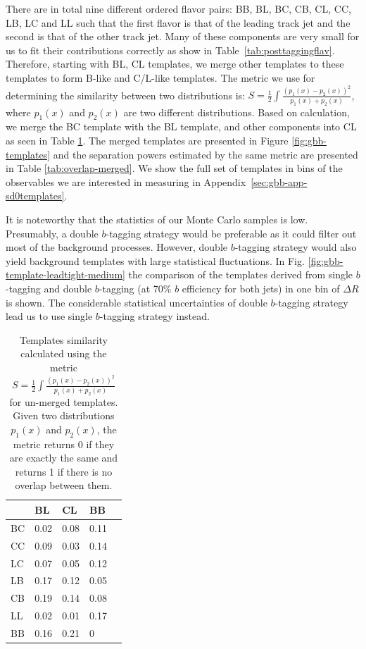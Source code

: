 There are in total nine different ordered flavor pairs: BB, BL, BC, CB, CL, CC, 
LB, LC and LL such that the first flavor is that of the leading track jet and 
the second is that of the other track jet. Many of these components are very small 
for us to fit their contributions correctly as show in Table~\ref{tab:posttaggingflav}. 
Therefore, starting with BL, CL templates, we merge other templates to these templates
to form B-like and C/L-like templates. The metric we use for determining the similarity 
between two distributions is: $S=\frac{1}{2}\int \frac{(p_1(x)-p_2(x))^2}{p_1(x)+p_2(x)}$, 
where $p_1(x)$ and $p_2(x)$ are two different distributions. 
Based on calculation, we merge the BC template with the BL 
template, and other components into CL as seen in 
Table \ref{tab:overlap-unmerged}. The merged templates are 
presented in Figure \ref{fig:gbb-templates} and the separation powers estimated by the same metric are 
presented in Table \ref{tab:overlap-merged}. 
We show the full set of templates in bins of the observables we are interested in 
measuring in Appendix~\ref{sec:gbb-app-sd0templates}. 

It is noteworthy that the statistics of our Monte Carlo samples is low.
Presumably, a double $b$-tagging strategy would be preferable as it could filter 
out most of the background processes.
However, double $b$-tagging strategy would also yield background templates with large 
statistical fluctuations. In Fig. \ref{fig:gbb-template-leadtight-medium} the comparison 
of the templates derived from single $b$-tagging and double $b$-tagging (at 70\% $b$ 
efficiency for both jets) in one bin of $\Delta R$ is shown. The considerable statistical uncertainties
of double $b$-tagging strategy lead us to use single $b$-tagging strategy instead. 


\begin{table}[htpb]
\centering
\begin{tabular}{|l|l|l|l|l|}
\hline
   & BL   & CL    & BB   \\ \hline
BC & 0.02 & 0.08  & 0.11 \\ \hline
CC & 0.09 & 0.03  & 0.14 \\ \hline
LC & 0.07 & 0.05  & 0.12 \\ \hline
LB & 0.17 & 0.12  & 0.05 \\ \hline
CB & 0.19 & 0.14  & 0.08 \\ \hline
LL & 0.02 & 0.01  & 0.17 \\ \hline
BB & 0.16 & 0.21  & 0    \\ \hline

\end{tabular}
\caption{Templates similarity calculated using the metric $S=\frac{1}{2}\int \frac{(p_1(x)-p_2(x))^2}{p_1(x)+p_2(x)}$ for un-merged templates. Given two distributions $p_1(x)$ and $p_2(x)$, the metric returns 0 if they are exactly the same and returns 1 if there is no overlap between them.}
\label{tab:overlap-unmerged}
\end{table}



